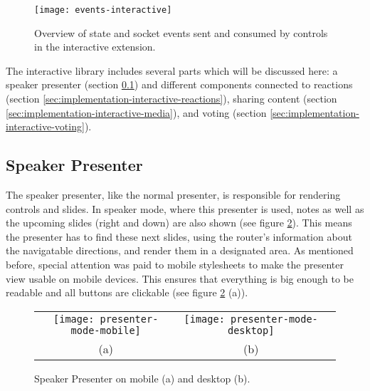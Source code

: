 \begin{figure}
\centering
\texttt{[image: events-interactive]}
\caption{Overview of state and socket events sent and consumed by controls in the interactive extension.}
\label{fig:implementation-events-interactive}
\end{figure}

The interactive library includes several parts which will be discussed here: a speaker presenter (section \ref{sec:implementation-interactive-speaker-presenter}) and different components connected to reactions (section \ref{sec:implementation-interactive-reactions}), sharing content (section \ref{sec:implementation-interactive-media}), and voting (section \ref{sec:implementation-interactive-voting}).

\subsection{Speaker Presenter}
\label{sec:implementation-interactive-speaker-presenter}

The speaker presenter, like the normal presenter, is responsible for rendering controls and slides. In speaker mode, where this presenter is used, notes as well as the upcoming slides (right and down) are also shown (see figure \ref{fig:implementation-interactive-speaker-presenter}).
This means the presenter has to find these next slides, using the router's information about the navigatable directions, and render them in a designated area. As mentioned before, special attention was paid to mobile stylesheets to make the presenter view usable on mobile devices. This ensures that everything is big enough to be readable and all buttons are clickable (see figure \ref{fig:implementation-interactive-speaker-presenter} (a)).

\begin{figure}
\centering
\begin{tabular}{ccc}
\texttt{[image: presenter-mode-mobile]} &
\texttt{[image: presenter-mode-desktop]} \\
(a) & (b)
\end{tabular}
\caption{Speaker Presenter on mobile (a) and desktop (b).}
\label{fig:implementation-interactive-speaker-presenter}
\end{figure}

